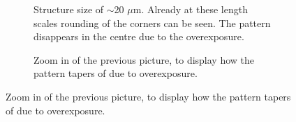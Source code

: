  \begin{figure}[!t]
     \centering
     \begin{subfigure}[t]{0.24\linewidth}
  	\centering
  	\caption{Structure size of $\sim$20 $\mu$m. Already at these length scales rounding of the corners can be seen. The pattern disappears in the centre due to the overexposure.}
  	\label{fig:b2d22_q22}
  \end{subfigure}
 \hfill
     \begin{subfigure}[t]{0.24\linewidth}
  	\centering
  	\caption{Zoom in of the previous picture, to display how the pattern tapers of due to overexposure.}

\end{subfigure}
\end{figure}
